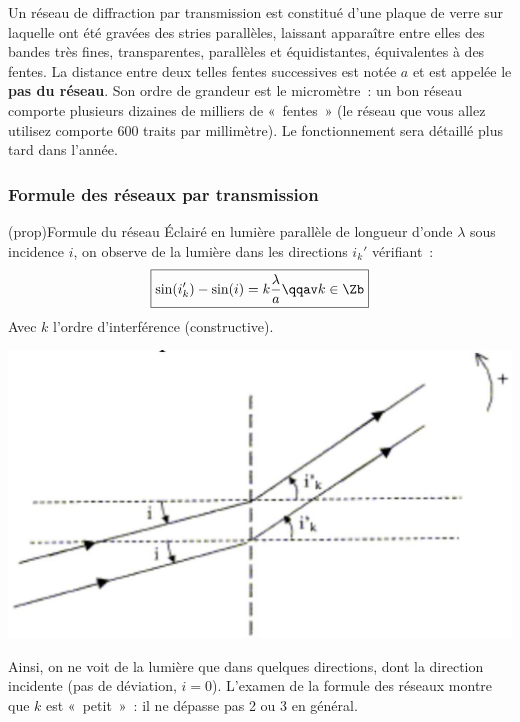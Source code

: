 \documentclass[../main/main.tex]{subfiles}
\begin{document}
Un réseau de diffraction par transmission est constitué d'une plaque de verre
sur laquelle ont été gravées des stries parallèles, laissant apparaître entre
elles des bandes très fines, transparentes, parallèles et équidistantes,
équivalentes à des fentes. La distance entre deux telles fentes successives est
notée $a$ et est appelée le \textbf{pas du réseau}. Son ordre de grandeur est le
micromètre~: un bon réseau comporte plusieurs dizaines de milliers de «~fentes~»
(le réseau que vous allez utilisez comporte 600 traits par millimètre). Le
fonctionnement sera détaillé plus tard dans l'année.


\subsubsection{Formule des réseaux par transmission}

\begin{tcb}[sidebyside, righthand ratio=.4](prop){Formule du réseau}
Éclairé en lumière parallèle de longueur d'onde $\lambda$ sous incidence $i$, on
observe de la lumière dans les directions $i_{k}'$ vérifiant~:
\[
  \boxed{\sin(i_{k}')-\sin(i) = k\frac{\lambda}{a} \qqav k\in \Zb}
\]
Avec $k$ l'ordre d'interférence (constructive).
\tcblower
  \begin{center}
      \includegraphics[width=\linewidth]{reseau}
  \end{center}
\end{tcb}
Ainsi, on ne voit de la lumière
que dans quelques directions, dont la direction incidente (pas de déviation,
$i=0$). L'examen de la formule des réseaux montre que $k$ est «~petit~»~: il ne
dépasse pas 2 ou 3 en général.
\end{document}

